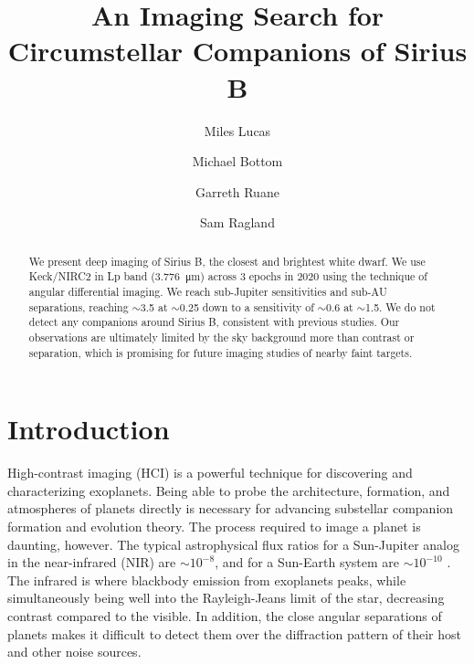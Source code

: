 \documentclass[twocolumn]{aastex631}
\begin{document}
\title{An Imaging Search for Circumstellar Companions of Sirius B}



\author[0000-0001-6341-310X]{Miles Lucas}

\author[0000-0003-1341-5531]{Michael Bottom}

\author[0000-0003-4769-1665]{Garreth Ruane}

\author[0000-0002-0696-1780]{Sam Ragland}


\begin{abstract}
We present deep imaging of Sirius B, the closest and brightest white dwarf. We use Keck/NIRC2 in Lp band (\qty{3.776}{\micro\meter}) across 3 epochs in 2020 using the technique of angular differential imaging. We reach sub-Jupiter sensitivities and sub-AU separations, reaching $\sim$\qty{3.5}{\jupitermass} at $\sim$\qty{0.25}{\au} down to a sensitivity of $\sim$\qty{0.6}{\jupitermass} at $\sim$\qty{1.5}{\au}. We do not detect any companions around Sirius B, consistent with previous studies. Our observations are ultimately limited by the sky background more than contrast or separation, which is promising for future imaging studies of nearby faint targets.
\end{abstract}

\section{Introduction} \label{sec:intro}

High-contrast imaging (HCI) is a powerful technique for discovering and characterizing exoplanets. Being able to probe the architecture, formation, and atmospheres of planets directly is necessary for advancing substellar companion formation and evolution theory. The process required to image a planet is daunting, however. The typical astrophysical flux ratios for a Sun-Jupiter analog in the near-infrared (NIR) are $\sim$$10^{-8}$, and for a Sun-Earth system are $\sim$$10^{-10}$ \citep{traub_direct_2010}. The infrared is where blackbody emission from exoplanets peaks, while simultaneously being well into the Rayleigh-Jeans limit of the star, decreasing contrast compared to the visible. In addition, the close angular separations of planets makes it difficult to detect them over the diffraction pattern of their host and other noise sources.
\end{document}
